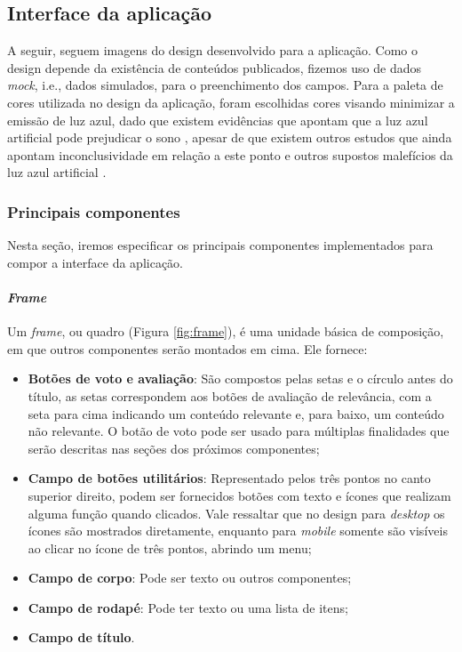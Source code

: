 \subsection{Interface da aplicação}
A seguir, seguem imagens do design desenvolvido para a aplicação. Como o design depende da existência de conteúdos publicados, fizemos uso de dados \textit{mock}, i.e., dados simulados, para o preenchimento dos campos. Para a paleta de cores utilizada no design da aplicação, foram escolhidas cores visando minimizar a emissão de luz azul, dado que existem evidências que apontam que a luz azul artificial pode prejudicar o sono \cite{blueWorsenSleep}, apesar de que existem outros estudos que ainda apontam inconclusividade em relação a este ponto e outros supostos malefícios da luz azul artificial \cite{blueInconclusive}.


\subsubsection{Principais componentes}
Nesta seção, iremos especificar os principais componentes implementados para compor a interface da aplicação.

\paragraph{\textit{Frame}}

Um \textit{frame}, ou quadro (Figura \ref{fig:frame}), é uma unidade básica de composição, em que outros componentes serão montados em cima. Ele fornece:
\begin{itemize}
    \item \textbf{Botões de voto e avaliação}: São compostos pelas setas e o círculo antes do título, as setas correspondem aos botões de avaliação de relevância, com a seta para cima indicando um conteúdo relevante e, para baixo, um conteúdo não relevante. O botão de voto pode ser usado para múltiplas finalidades que serão descritas nas seções dos próximos componentes;
    \item \textbf{Campo de botões utilitários}: Representado pelos três pontos no canto superior direito, podem ser fornecidos botões com texto e ícones que realizam alguma função quando clicados. Vale ressaltar que no design para \textit{desktop} os ícones são mostrados diretamente, enquanto para \textit{mobile} somente são visíveis ao clicar no ícone de três pontos, abrindo um menu;
    \item \textbf{Campo de corpo}: Pode ser texto ou outros componentes;
    \item \textbf{Campo de rodapé}: Pode ter texto ou uma lista de itens;
    \item \textbf{Campo de título}.
\end{itemize}


